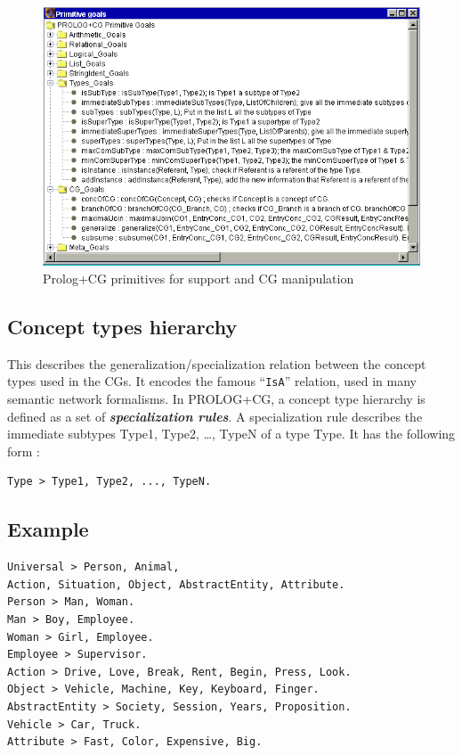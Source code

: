 \documentclass{book}
\begin{document}
\begin{htmlonly}

\begin{figure}
\begin{center}
\includegraphics{EnvPrimHierCG.png}
\end{center}
\caption{\label{EnvPrimHierCG}Prolog+CG primitives for support and CG
manipulation}
\end{figure}

\end{htmlonly}


\subsection{Concept types hierarchy}

This describes the generalization/specialization relation between the
concept types used in the CGs. It encodes the famous ``\texttt{IsA}''
relation, used in many semantic network formalisms. In PROLOG+CG, a
concept type hierarchy is defined as a set of
{\bf {\it specialization rules}}. A specialization rule
describes the immediate subtypes Type1, Type2, \ldots{}, TypeN of a
type Type. It has the following form :

\begin{verbatim}
Type > Type1, Type2, ..., TypeN.
\end{verbatim}

\subsection{Example}


\begin{verbatim}
Universal > Person, Animal,
Action, Situation, Object, AbstractEntity, Attribute.
Person > Man, Woman.
Man > Boy, Employee.
Woman > Girl, Employee.
Employee > Supervisor.
Action > Drive, Love, Break, Rent, Begin, Press, Look.
Object > Vehicle, Machine, Key, Keyboard, Finger.
AbstractEntity > Society, Session, Years, Proposition.
Vehicle > Car, Truck.
Attribute > Fast, Color, Expensive, Big.
\end{verbatim}
\end{document}

